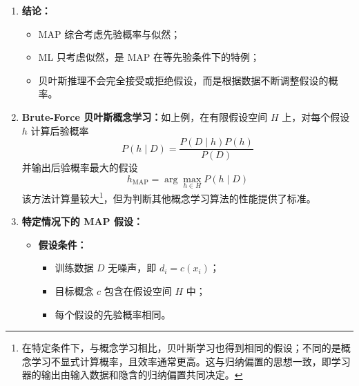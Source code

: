 \documentclass[../main.tex]{subfiles}
\begin{document}
\begin{enumerate}
{    若医生决定给该病人做第二次化验，且结果仍为正。假设两次测试相互独立，则
    $$
    P(++\mid \mathrm{cancer})=0.98^2=0.9604
    $$
    $$
    P(++\mid \neg \mathrm{cancer})=0.03^2=0.0009
    $$
    因而
    $$
    P(\mathrm{cancer}\mid ++)
    =\frac{P(++\mid \mathrm{cancer})P(\mathrm{cancer})}
    {P(++\mid \mathrm{cancer})P(\mathrm{cancer})+P(++\mid \neg \mathrm{cancer})P(\neg \mathrm{cancer})}
    $$
    $$
    =\frac{0.9604\times 0.008}{0.9604\times 0.008+0.0009\times 0.992}
    =\frac{0.0076832}{0.008576}\approx 0.896
    $$
    $$
    P(\neg \mathrm{cancer}\mid ++)=1-P(\mathrm{cancer}\mid ++)\approx 0.104
    $$
    }

    \item \textbf{结论：}
    \begin{itemize}
        \item MAP 综合考虑先验概率与似然；
        \item ML 只考虑似然，是 MAP 在等先验条件下的特例；
        \item 贝叶斯推理不会完全接受或拒绝假设，而是根据数据不断调整假设的概率。
    \end{itemize}
    \item \textbf{Brute-Force 贝叶斯概念学习：}如上例，在有限假设空间 $H$ 上，对每个假设 $h$ 计算后验概率
    $$
    P(h\mid D)=\frac{P(D\mid h)P(h)}{P(D)}
    $$
    并输出后验概率最大的假设
    $$
    h_{\mathrm{MAP}}=\arg\max_{h\in H}P(h\mid D)
    $$
    该方法计算量较大\footnote{在特定条件下，与概念学习相比，贝叶斯学习也得到相同的假设；不同的是概念学习不显式计算概率，且效率通常更高。这与归纳偏置的思想一致，即学习器的输出由输入数据和隐含的归纳偏置共同决定。}，但为判断其他概念学习算法的性能提供了标准。

    \item \textbf{特定情况下的 MAP 假设：}
    \begin{itemize}
        \item \textbf{假设条件：}
        \begin{itemize}
            \item 训练数据 $D$ 无噪声，即 $d_i=c(x_i)$；
            \item 目标概念 $c$ 包含在假设空间 $H$ 中；
            \item 每个假设的先验概率相同。
        \end{itemize}


\end{itemize}
\end{enumerate}
\end{document}
